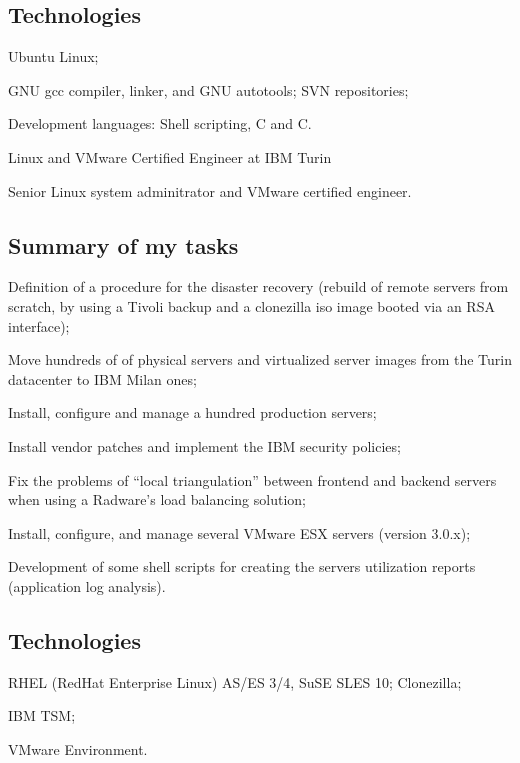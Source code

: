 \subsection{Technologies}

\item{\bdot} Ubuntu Linux;
\item{\bdot} GNU gcc compiler, linker, and GNU autotools; SVN repositories;
\item{\bdot} Development languages: Shell scripting, C and C\plusplus.

\bigskip
{}
   {Linux and VMware Certified Engineer at IBM Turin}

\noindent
Senior Linux system adminitrator and VMware certified engineer.

\subsection{Summary of my tasks}

\item{\bdot} Definition of a procedure for the disaster recovery 
   (rebuild of remote servers from scratch, by using a Tivoli backup and a 
    clonezilla iso image booted via an RSA interface);
\item{\bdot} Move hundreds of of physical servers and virtualized server 
   images from the Turin datacenter to IBM Milan ones;
\item{\bdot} Install, configure and manage a hundred production servers;
\item{\bdot} Install vendor patches and implement the IBM security policies;
\item{\bdot} Fix the problems of ``local triangulation'' between frontend 
   and backend servers when using a Radware's load balancing solution;
\item{\bdot} Install, configure, and manage several VMware ESX servers 
   (version 3.0.x);
\item{\bdot} Development of some shell scripts for creating the servers 
   utilization reports (application log analysis).

\subsection{Technologies}

\item{\bdot} RHEL (RedHat Enterprise Linux) AS/ES 3/4, SuSE SLES 10; Clonezilla;
\item{\bdot} IBM TSM;
\item{\bdot} VMware Environment.
 
